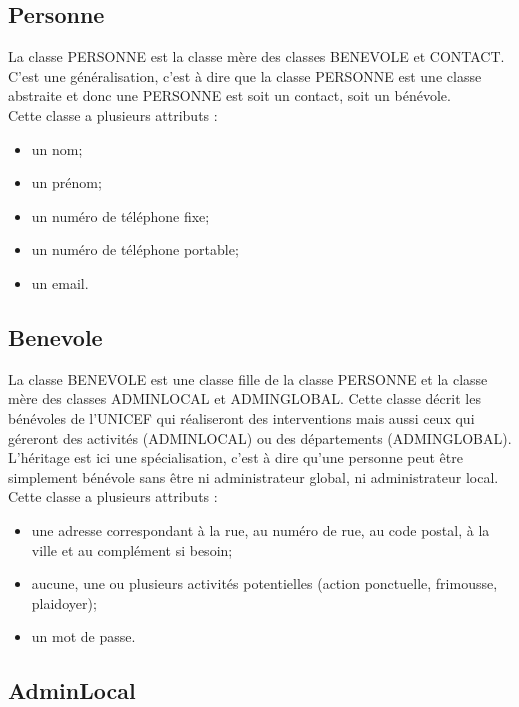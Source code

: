 \documentclass[asi, sansVersion]{picInsa}
\begin{document}
\subsection*{Personne}

La classe PERSONNE est la classe mère des classes BENEVOLE et CONTACT. C'est une généralisation, c'est à dire que la classe PERSONNE est une classe abstraite et donc une PERSONNE est soit un contact, soit un bénévole. \\
Cette classe a plusieurs attributs : 
\begin{itemize}
\item un nom; %
\item un prénom; %
\item un numéro de téléphone fixe; %
\item un numéro de téléphone portable; %
\item un email. %
\end{itemize}

\subsection*{Benevole}

La classe BENEVOLE est une classe fille de la classe PERSONNE et la classe mère des classes ADMINLOCAL et ADMINGLOBAL. Cette classe décrit les bénévoles de l'UNICEF qui réaliseront des interventions mais aussi ceux qui géreront des activités (ADMINLOCAL) ou des départements (ADMINGLOBAL). L'héritage est ici une spécialisation, c'est à dire qu'une personne peut être simplement bénévole sans être ni administrateur global, ni administrateur local. \\
Cette classe a plusieurs attributs : 
\begin{itemize}
\item une adresse correspondant à la rue, au numéro de rue, au code postal, à la ville et au complément si besoin; %
\item aucune, une ou plusieurs activités potentielles (action ponctuelle, frimousse, plaidoyer); %
\item un mot de passe. 
\end{itemize}

\subsection*{AdminLocal}
\end{document}
